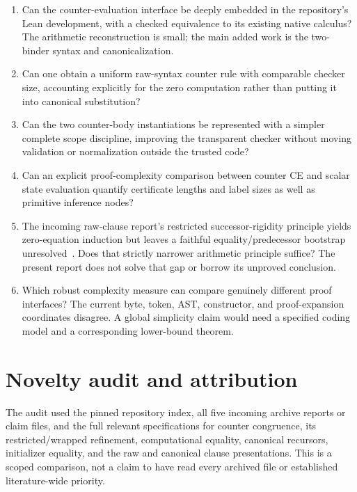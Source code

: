 \documentclass[11pt,letterpaper]{article}
\theoremstyle{definition}
\begin{document}
\begin{enumerate}
\item Can the counter-evaluation interface be deeply embedded in the
repository's Lean development, with a checked equivalence to its
existing native calculus? The arithmetic reconstruction is small;
the main added work is the two-binder syntax and canonicalization.
\item Can one obtain a uniform raw-syntax counter rule with comparable
checker size, accounting explicitly for the zero computation rather
than putting it into canonical substitution?
\item Can the two counter-body instantiations be represented with a
simpler complete scope discipline, improving the transparent checker
without moving validation or normalization outside the trusted code?
\item Can an explicit proof-complexity comparison between counter CE
and scalar state evaluation quantify certificate lengths and label
sizes as well as primitive inference nodes?
\item The incoming raw-clause report's restricted successor-rigidity
principle yields zero-equation induction but leaves a faithful
equality/predecessor bootstrap unresolved~\cite{raw}. Does that
strictly narrower arithmetic principle suffice? The present report
does not solve that gap or borrow its unproved conclusion.
\item Which robust complexity measure can compare genuinely different
proof interfaces? The current byte, token, AST, constructor, and
proof-expansion coordinates disagree. A global simplicity claim would
need a specified coding model and a corresponding lower-bound theorem.
\end{enumerate}

\appendix
\section{Novelty audit and attribution}

The audit used the pinned repository index, all five incoming archive
reports or claim files, and the full relevant specifications for
counter congruence, its restricted/wrapped refinement, computational
equality, canonical recursors, initializer equality, and the raw and
canonical clause presentations. This is a scoped comparison, not a
claim to have read every archived file or established literature-wide
priority.
\end{document}
